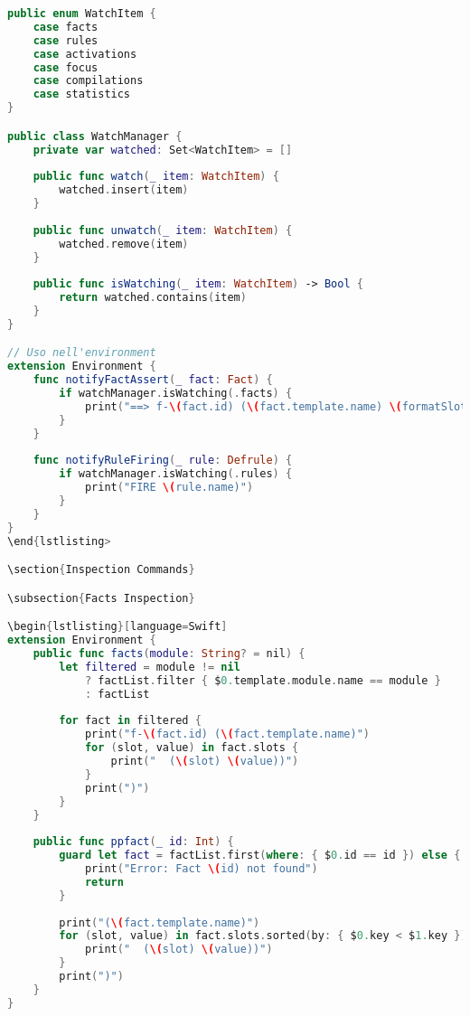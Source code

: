 \begin{lstlisting}[language=Swift]
public enum WatchItem {
    case facts
    case rules
    case activations
    case focus
    case compilations
    case statistics
}

public class WatchManager {
    private var watched: Set<WatchItem> = []
    
    public func watch(_ item: WatchItem) {
        watched.insert(item)
    }
    
    public func unwatch(_ item: WatchItem) {
        watched.remove(item)
    }
    
    public func isWatching(_ item: WatchItem) -> Bool {
        return watched.contains(item)
    }
}

// Uso nell'environment
extension Environment {
    func notifyFactAssert(_ fact: Fact) {
        if watchManager.isWatching(.facts) {
            print("==> f-\(fact.id) (\(fact.template.name) \(formatSlots(fact.slots)))")
        }
    }
    
    func notifyRuleFiring(_ rule: Defrule) {
        if watchManager.isWatching(.rules) {
            print("FIRE \(rule.name)")
        }
    }
}
\end{lstlisting>

\section{Inspection Commands}

\subsection{Facts Inspection}

\begin{lstlisting}[language=Swift]
extension Environment {
    public func facts(module: String? = nil) {
        let filtered = module != nil 
            ? factList.filter { $0.template.module.name == module }
            : factList
        
        for fact in filtered {
            print("f-\(fact.id) (\(fact.template.name)")
            for (slot, value) in fact.slots {
                print("  (\(slot) \(value))")
            }
            print(")")
        }
    }
    
    public func ppfact(_ id: Int) {
        guard let fact = factList.first(where: { $0.id == id }) else {
            print("Error: Fact \(id) not found")
            return
        }
        
        print("(\(fact.template.name)")
        for (slot, value) in fact.slots.sorted(by: { $0.key < $1.key }) {
            print("  (\(slot) \(value))")
        }
        print(")")
    }
}
\end{lstlisting}

